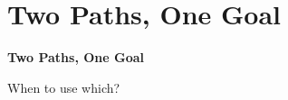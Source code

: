\documentclass[aspectratio=169]{beamer}
\begin{document}
\section{Two Paths, One Goal}

\begin{frame}
\begin{center}
  \vspace{1.5cm}
  {\Huge\bfseries\textcolor{popblue}{Two Paths, One Goal}}

  \vspace{0.8cm}
  {\large When to use which?}
\end{center}
\end{frame}
\end{document}
